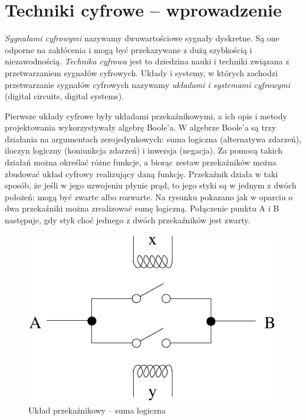 \documentclass[a4paper,11pt]{article}
\begin{document}
 
\section*{Techniki cyfrowe -- wprowadzenie}
\textit{Sygnałami cyfrowymi} nazywamy dwuwartościowe sygnały dyskretne. Są one odporne na zakłócenia i mogą być przekazywane z dużą szybkością i niezawodnością. \textit{Technika cyfrowa} jest to dziedzina nauki i techniki związana z przetwarzaniem sygnałów cyfrowych. Układy i systemy, w których zachodzi przetwarzanie sygnałów cyfrowych nazywamy \textit{układami i systemami cyfrowymi}  (digital circuits, digital systems).  \par 

	Pierwsze układy cyfrowe były układami przekaźnikowymi, a ich opis i metody projektowania wykorzystywały algebrę Boole'a. W algebrze Boole'a są trzy działania na argumentach zerojedynkowych: suma logiczna (alternatywa zdarzeń), iloczyn logiczny (koniunkcja zdarzeń) i inwersja (negacja). Za pomocą takich działań można określać różne funkcje, a biorąc zestaw przekaźników można zbudować układ cyfrowy realizujący daną funkcję. Przekaźnik działa w taki sposób, że jeśli w jego uzwojeniu płynie prąd, to jego styki są w jednym z dwóch położeń: mogą być zwarte albo rozwarte. Na rysunku pokazano jak w oparciu o dwa przekaźniki można zrealizować sumę logiczną. Połączenie punktu A i B następuje, gdy styk choć jednego z dwóch przekaźników jest zwarty.\par	
	
\begin{figure}[!htb]
\centerline{\includegraphics[scale=0.6]{uklad-przekaznikowy.pdf}}
\caption{Układ przekaźnikowy -- suma logiczna}
\label{fig:ukladPrzekaznikowy}
\end{figure}
\end{document}
